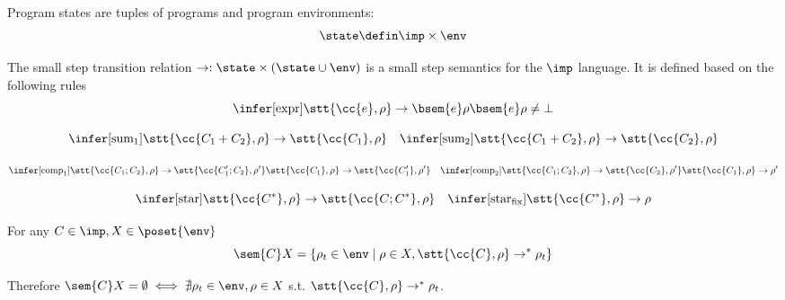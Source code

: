 \begin{definition}
  Program states are tuples of programs and program
  environments: \[\state \defin \imp \times \env\]
\end{definition}

\begin{definition}\label{def:sosem}
  The small step transition relation \(\to : \state \times (\state
  \cup \env)\) is a small step semantics for the
  \(\imp\) language. It is defined based on the following rules
  \[\infer[\text{expr}]
          {\stt{\cc{e}, \rho} \to \bsem{e}\rho}
          {\bsem{e}\rho \neq \bot}\]
          
          \[\infer[\text{sum}_1]
                  {\stt{\cc{C_1 + C_2}, \rho} \to \stt{\cc{C_1}, \rho}}
                  {} \quad
                  \infer[\text{sum}_2]
                        {\stt{\cc{C_1 + C_2}, \rho} \to \stt{\cc{C_2}, \rho}}
                        {}\]
                        
                        \[\infer[\text{comp}_1]
                                {\stt{\cc{C_1; C_2}, \rho} \to \stt{\cc{C_1'; C_2}, \rho'}}
                                {\stt{\cc{C_1}, \rho} \to \stt{\cc{C_1'}, \rho'}} \quad
                                \infer[\text{comp}_2]
                                      {\stt{\cc{C_1; C_2}, \rho} \to \stt{\cc{C_2}, \rho'}}
                                      {\stt{\cc{C_1}, \rho} \to \rho'}\]

                                      \[\infer[\text{star}]
                                              {\stt{\cc{C^*}, \rho} \to \stt{\cc{C;C^*}, \rho}}
                                              {} \quad
                                              \infer[\text{star}_{\text{fix}}]
                                                    {\stt{\cc{C^*}, \rho} \to \rho}
                                                    {}\]
\end{definition}

\begin{lemma}\label{le:link}
  For any \(C\in\imp, X \in \poset{\env}\) \[\sem{C}X = \{\rho_t \in
  \env \mid \rho \in X, \stt{\cc{C}, \rho} \to^* \rho_t\}\]
\end{lemma}

Therefore \(\sem{C}X = \emptyset \iff \nexists \rho_t \in \env, \rho
\in X\) s.t. \(\stt{\cc{C}, \rho} \to^* \rho_t\).

